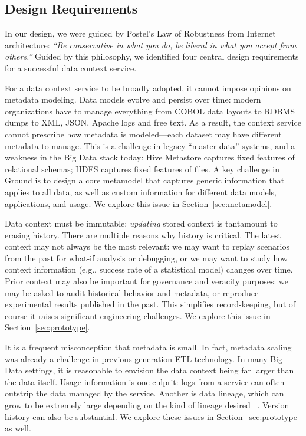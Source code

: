 \documentclass{cidr-2017}
\begin{document}
\subsection{Design Requirements}
In our design, we were guided by Postel's Law of Robustness from Internet architecture: \emph{``Be conservative in what you do, be liberal in what you accept from others.''}  %
Guided by this philosophy, we identified four central design requirements for a successful data context service.

 For a data context service to be broadly adopted, it cannot impose opinions on metadata modeling. 
Data models evolve and persist over time: modern organizations have to manage everything from COBOL data layouts to RDBMS dumps to XML, JSON, Apache logs and free text. 
As a result, the context service cannot 
prescribe 
how metadata is modeled---each dataset may have different metadata to manage. 
This is a challenge in legacy ``master data'' systems, and  a weakness in the Big Data stack today: Hive Metastore captures fixed features of relational schemas; HDFS captures fixed features of files.  
A key challenge in Ground is to design a core metamodel that captures generic information that applies to all data, as well as custom information for different data models, applications, and usage.
We explore this issue in Section~\ref{sec:metamodel}.

 Data context must be immutable; \emph{updating} stored context is tantamount to erasing history. %
There are multiple reasons why history is critical. 
The latest context may not always be the most relevant: we may want to replay scenarios from the past for what-if analysis or debugging, or we may want to study how context information (e.g., success rate of a statistical model) changes over time.
Prior context may also be important for governance and veracity purposes: we may be asked to audit historical behavior and metadata, or reproduce experimental results published in the past. 
This simplifies record-keeping, but of course it raises significant engineering challenges.  
We explore this issue in Section~\ref{sec:prototype}.

 It is a frequent misconception that metadata is small. In fact, metadata scaling was already a challenge in previous-generation ETL technology. In many Big Data settings, it is reasonable to envision the data context being far larger than the data itself. Usage information is one culprit:  logs from a service can often outstrip the data managed by the service. Another is data lineage, which can grow to be extremely large
depending on the kind of lineage desired
~\cite{cheney2009provenance}.  Version history can also be substantial. 
We explore these issues in Section~\ref{sec:prototype} as well.
\end{document}
